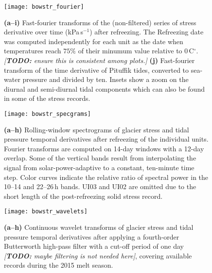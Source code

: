 \documentclass[utf8]{article}
\newcommand{\todo}[1]{\textcolor{c3}{\emph{[\textbf{TODO:} #1]}}}
\begin{document}
    \begin{figure}
      \centerline{\texttt{[image: bowstr\_fourier]}}
      \caption{%
        \textbf{(a--i)}
          Fast-fourier transforms of the (non-filtered) series of stress
          derivative over time (kPa$\,$s$^{-1}$) after refreezing. The
          Refreezing date was computed independently for each unit as the date
          when temperatures reach $75\%$ of their minumum value relative to
          0$\,$C$^\circ$. \todo{ensure this is consistent among plots.}
        \textbf{(j)}
          Fast-fourier transform of the time derivative of Pituffik tides,
          converted to sea-water pressure and divided by ten. Insets show a
          zoom on the diurnal and semi-diurnal tidal components which can also
          be found in some of the stress records.}
      \label{fig:fourier}
    \end{figure}

    \begin{figure}
      \centerline{\texttt{[image: bowstr\_specgrams]}}
      \caption{%
        \textbf{(a--h)}
          Rolling-window spectrograms of glacier stress and tidal pressure
          temporal derivatives after refreezing of the individual units.
          Fourier transforms are computed on 14-day windows with a 12-day
          overlap. Some of the vertical bands result from interpolating the
          signal from solar-power-adaptive to a constant, ten-minute time step.
          Color curves indicate the relative ratio of spectral power in the
          10--14 and 22--26\,h bands. UI03 and UI02 are omitted due to the
          short length of the post-refreezing solid stress record.}
      \label{fig:specgrams}
    \end{figure}

    \begin{figure}
      \centerline{\texttt{[image: bowstr\_wavelets]}}
      \caption{%
        \textbf{(a--h)}
          Continuous wavelet transforms of glacier stress and tidal pressure
          temporal derivatives after applying a fourth-order Butterworth
          high-pass filter with a cut-off period of one day \todo{maybe
          filtering is not needed here}, covering available records during the
          2015 melt season.}
      \label{fig:wavelets}
    \end{figure}
\end{document}
